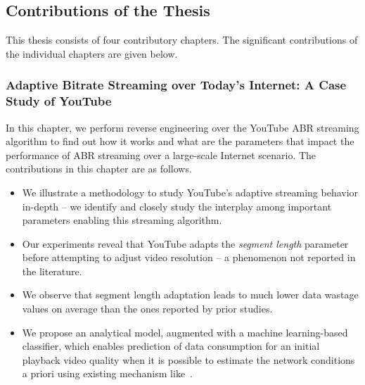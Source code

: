 \subsection{Contributions of the Thesis}
This thesis consists of four contributory chapters. The significant contributions of the individual chapters are given below. 

\subsubsection{Adaptive Bitrate Streaming over Today's Internet: A Case Study of YouTube}
In this chapter, we perform reverse engineering over the YouTube ABR streaming algorithm to find out how it works and what are the parameters that impact the performance of ABR streaming over a large-scale Internet scenario. The contributions in this chapter are as follows. 
\begin{itemize}
	\item We illustrate a methodology to study YouTube's adaptive streaming behavior in-depth -- we identify and closely study the interplay among important parameters enabling this streaming algorithm.
	\item Our experiments reveal that YouTube adapts the {\it segment length} parameter before attempting to adjust video resolution -- a phenomenon not reported in the literature.
	\item We observe that segment length adaptation leads to much lower data wastage values on average than the ones reported by prior studies.
	\item We propose an analytical model, augmented with a machine learning-based classifier, which enables prediction of data consumption for an initial playback video quality when it is possible to estimate the network conditions a priori using existing mechanism like~\cite{Zou2015}.
\end{itemize}

